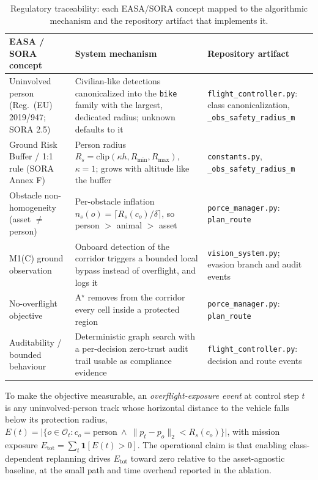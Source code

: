 \documentclass[journal,twoside,web]{ieeecolor}
\begin{document}
\begin{table}[t]
    \centering
    \small
    \begin{tabular}{@{}p{}p{}p{}@{}}
        \toprule
        \textbf{EASA / SORA concept} & \textbf{System mechanism} & \textbf{Repository artifact} \\
        \midrule
        Uninvolved person (Reg.\ (EU) 2019/947; SORA 2.5)~\cite{EU2019_947,JARUS_SORA_2_5_2024} & Civilian-like detections canonicalized into the \texttt{bike} family with the largest, dedicated radius; unknown defaults to it & \texttt{flight\_controller.py}: class canonicalization, \texttt{\_obs\_safety\_radius\_m} \\
        Ground Risk Buffer / 1:1 rule (SORA Annex F)~\cite{JARUS_SORA_2_5_2024} & Person radius $R_s=\mathrm{clip}(\kappa h,R_{\min},R_{\max})$, $\kappa=1$; grows with altitude like the buffer & \texttt{constants.py}, \texttt{\_obs\_safety\_radius\_m} \\
        Obstacle non-homogeneity (asset $\neq$ person) & Per-obstacle inflation $n_s(o)=\lceil R_s(c_o)/\delta\rceil$, so person $>$ animal $>$ asset & \texttt{porce\_manager.py}: \texttt{plan\_route} \\
        M1(C) ground observation~\cite{EASA_AMC_GM_SORA25_2025} & Onboard detection of the corridor triggers a bounded local bypass instead of overflight, and logs it & \texttt{vision\_system.py}; evasion branch and audit events \\
        No-overflight objective & A$^\star$ removes from the corridor every cell inside a protected region & \texttt{porce\_manager.py}: \texttt{plan\_route} \\
        Auditability / bounded behaviour~\cite{EASA_AI_Roadmap_2.0} & Deterministic graph search with a per-decision zero-trust audit trail usable as compliance evidence & \texttt{flight\_controller.py}: decision and route events \\
        \bottomrule
    \end{tabular}
    \caption{Regulatory traceability: each EASA/SORA concept mapped to the algorithmic mechanism and the repository artifact that implements it.}
    \label{tab:traceability}
\end{table}

To make the objective measurable, an \emph{overflight-exposure event} at control step $t$ is any uninvolved-person track whose horizontal distance to the vehicle falls below its protection radius, $E(t)=\lvert\{o\in\mathcal{O}_t : c_o=\mathrm{person}\ \wedge\ \lVert p_t-p_{o}\rVert_2<R_s(c_o)\}\rvert$, with mission exposure $E_{\mathrm{tot}}=\sum_t \mathbf{1}[E(t)>0]$. The operational claim is that enabling class-dependent replanning drives $E_{\mathrm{tot}}$ toward zero relative to the asset-agnostic baseline, at the small path and time overhead reported in the ablation.
\end{document}
